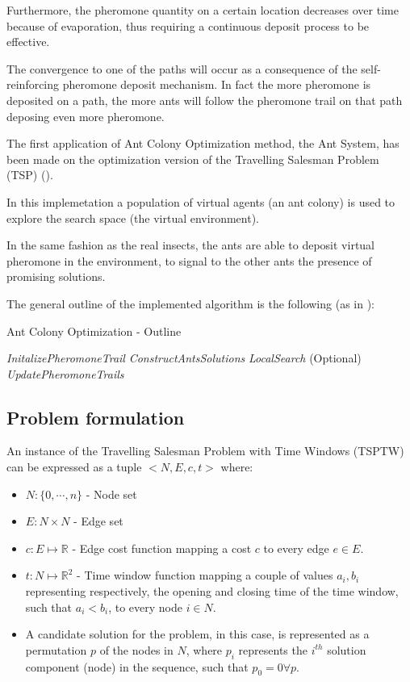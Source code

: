 \begin{homeworkProblem}
Furthermore, the pheromone quantity on a certain location decreases over time because of evaporation, thus requiring a continuous deposit process to be effective.

The convergence to one of the paths will occur as a consequence of the self-reinforcing pheromone deposit mechanism.
In fact the more pheromone is deposited on a path, the more ants will follow the pheromone trail on that path deposing even more pheromone.

The first application of Ant Colony Optimization method, the Ant System, has been made on the optimization version of the Travelling Salesman Problem (TSP) (\cite{dorigo1996ant}).

In this implemetation a population of virtual agents (an ant colony) is used to explore the search space (the virtual environment).

In the same fashion as the real insects, the ants are able to deposit virtual pheromone in the environment, to signal to the other ants the presence of promising solutions.

The general outline of the implemented algorithm is the following (as in \cite{dorigo2006artificial}):

\begin{algorithm}[!h]
  \caption{Ant Colony Optimization - Outline}\label{aco}
  \begin{algorithmic}[1]
    \State \emph{InitalizePheromoneTrail} 
        \State \emph{ConstructAntsSolutions}
        \State \emph{LocalSearch} (Optional)
        \State \emph{UpdatePheromoneTrails}
    \EndWhile
\end{algorithmic}
\end{algorithm}



\subsection{Problem formulation}
An instance of the Travelling Salesman Problem with Time Windows (TSPTW) can be expressed as a tuple $<N,E,c,t>$ where:
\begin{itemize}
  \item $N:\{0,\cdots,n\}$ - Node set 
  \item $E:N\times N$ - Edge set
  \item $c:E\mapsto \mathbb{R}$ - Edge cost function mapping a cost $c$ to every edge $e \in E$. 
  \item $t:N\mapsto \mathbb{R}^2$ - Time window function mapping a couple of values $a_i,b_i$ representing respectively, the opening and closing time of the time window, such that $a_i<b_i$, to every node $i \in N$.
  \item A candidate solution for the problem, in this case, is represented as a permutation $p$ of the nodes in $N$, where $p_i$ represents the $i^{th}$ solution component (node) in the sequence, such that $p_0 = 0 \forall p$.
\end{itemize}


\end{homeworkProblem}
